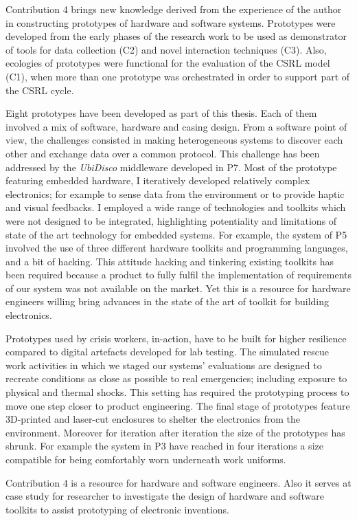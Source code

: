 Contribution 4 brings new knowledge derived from the experience of the author in constructing prototypes of hardware and software systems. Prototypes were developed from the early phases of the research work to be used as demonstrator of tools for data collection (C2) and novel interaction techniques (C3). Also, ecologies of prototypes were functional for the evaluation of the CSRL model (C1), when more than one prototype was orchestrated in order to support part of the CSRL cycle.

Eight prototypes have been developed as part of this thesis. Each of them involved a mix of software, hardware and casing design. From a software point of view, the challenges consisted in making heterogeneous systems to discover each other and exchange data over a common protocol. This challenge has been addressed by the \emph{UbiDisco} middleware developed in P7. Most of the prototype featuring embedded hardware, I iteratively developed relatively complex electronics; for example to sense data from the environment or to provide haptic and visual feedbacks. I employed a wide range of technologies and toolkits which were not designed to be integrated, highlighting potentiality and limitations of state of the art technology for embedded systems. For example, the system of P5 involved the use of three different hardware toolkits and programming languages, and a bit of hacking. This attitude hacking and tinkering existing toolkits has been required because a product to fully fulfil the implementation of requirements of our system was not available on the market. Yet this is a resource for hardware engineers willing bring advances in the state of the art of toolkit for building electronics.

Prototypes used by crisis workers, in-action, have to be built for higher resilience compared to digital artefacts developed for lab testing. The simulated rescue work activities in which we staged our systems' evaluations are designed to recreate conditions as close as possible to real emergencies; including exposure to physical and thermal shocks. This setting has required the prototyping process to move one step closer to product engineering. The final stage of prototypes feature 3D-printed and laser-cut enclosures to shelter the electronics from the environment. Moreover for iteration after iteration the size of the prototypes has shrunk. For example the system in P3 have reached in four iterations a size compatible for being comfortably worn underneath work uniforms.

Contribution 4 is a resource for hardware and software engineers. Also it serves at case study for researcher to investigate the design of hardware and software toolkits to assist prototyping of electronic inventions. 
